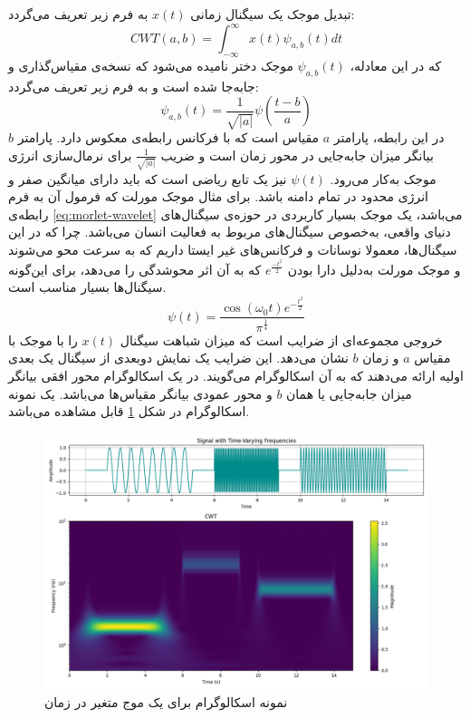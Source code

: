 تبدیل موجک یک سیگنال زمانی $x(t)$
به فرم زیر تعریف می‌گردد:
\begin{equation}
    \label{eq:wavelet-transform}
    CWT(a, b) = \int_{-\infty}^{\infty} x(t) \psi_{a,b}(t) dt
\end{equation}
که در این معادله، $\psi_{a,b}(t)$
موجک دختر
نامیده می‌شود که نسخه‌ی مقیاس‌گذاری و جابه‌جا شده است و به فرم زیر تعریف می‌گردد:
\begin{equation}
    \label{eq:daughter-wavelet}
    \psi_{a,b}(t) = \frac{1}{\sqrt{|a|}} \psi \left( \frac{t - b}{a} \right)
\end{equation}
در این رابطه، پارامتر $a$ مقیاس است
که با فرکانس رابطه‌ی معکوس دارد. پارامتر $b$
بیانگر میزان جابه‌جایی در محور زمان است و ضریب
$\frac{1}{\sqrt{|a|}}$
برای نرمال‌سازی انرژی موجک به‌کار می‌رود.
$\psi(t)$
نیز یک تابع ریاضی است که باید دارای میانگین صفر و انرژی محدود در تمام دامنه باشد. برای مثال موجک مورلت
که فرمول آن به فرم رابطه‌ی \ref{eq:morlet-wavelet}
می‌باشد، یک موجک بسیار کاربردی در حوزه‌ی سیگنال‌های دنیای واقعی، به‌خصوص سیگنال‌های مربوط به فعالیت انسان می‌باشد. چرا که در این سیگنال‌ها، معمولا نوسانات و فرکانس‌های غیر ایستا داریم که به سرعت محو می‌شوند و موجک مورلت به‌دلیل دارا بودن $e^{\frac{-t^2}{2}}$
که به آن اثر محوشدگی را می‌دهد، برای این‌گونه سیگنال‌ها بسیار مناسب است.
\begin{equation}
    \label{eq:morlet-wavelet}
    \psi(t) = \frac{\cos(\omega_0 t) e^{-\frac{t^2}{2}}}{\pi^{\frac{1}{4}}}
\end{equation}
خروجی 
مجموعه‌ای از ضرایب است که میزان شباهت سیگنال $x(t)$
را با موجک با مقیاس $a$ و زمان $b$
نشان می‌دهد. این ضرایب یک نمایش دوبعدی از سیگنال یک بعدی اولیه ارائه می‌دهند که به آن اسکالوگرام می‌گویند. در یک اسکالوگرام محور افقی بیانگر میزان جابه‌جایی یا همان $b$ و
محور عمودی بیانگر مقیاس‌ها می‌باشد. یک نمونه اسکالوگرام در شکل \ref{fig:wavelet-plot} قابل مشاهده می‌باشد.
\begin{figure}[htb!]
\centering
\includegraphics[width=1\textwidth]{Images/Chapter3/wavelet-plot.png}
\caption{نمونه اسکالوگرام برای یک موج متغیر در زمان}
\label{fig:wavelet-plot}
\end{figure}

